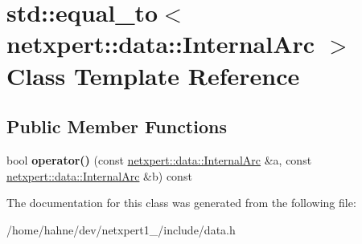 \hypertarget{classstd_1_1equal__to_3_01netxpert_1_1data_1_1InternalArc_01_4}{}\section{std\+:\+:equal\+\_\+to$<$ netxpert\+:\+:data\+:\+:Internal\+Arc $>$ Class Template Reference}
\label{classstd_1_1equal__to_3_01netxpert_1_1data_1_1InternalArc_01_4}
\subsection*{Public Member Functions}
\begin{DoxyCompactItemize}
\item 
bool {\bfseries operator()} (const \hyperlink{structnetxpert_1_1data_1_1InternalArc}{netxpert\+::data\+::\+Internal\+Arc} \&a, const \hyperlink{structnetxpert_1_1data_1_1InternalArc}{netxpert\+::data\+::\+Internal\+Arc} \&b) const \hypertarget{classstd_1_1equal__to_3_01netxpert_1_1data_1_1InternalArc_01_4_a4b6538fb00825f540bc3e94d28027d38}{}\label{classstd_1_1equal__to_3_01netxpert_1_1data_1_1InternalArc_01_4_a4b6538fb00825f540bc3e94d28027d38}

\end{DoxyCompactItemize}


The documentation for this class was generated from the following file\+:\begin{DoxyCompactItemize}
\item 
/home/hahne/dev/netxpert1\+\_/include/data.\+h\end{DoxyCompactItemize}
